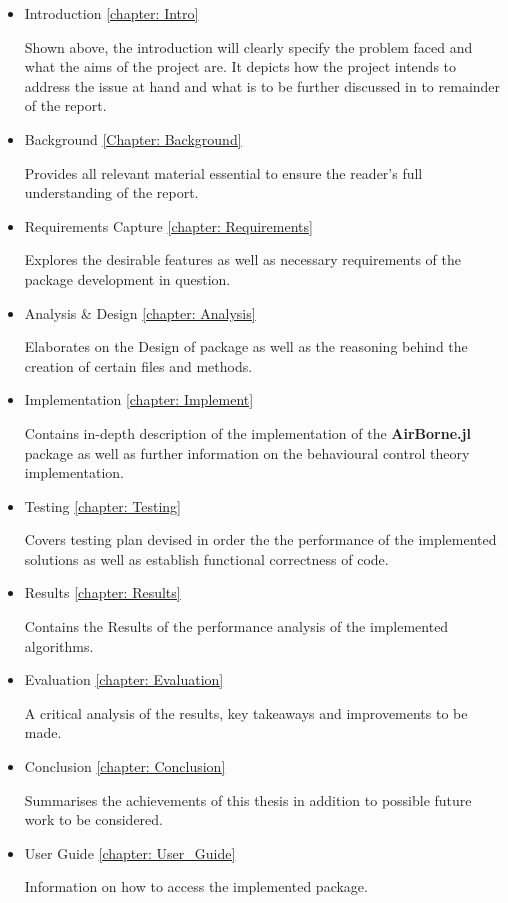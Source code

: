 \begin{itemize}
     \item Introduction \ref{chapter: Intro}
     
     Shown above, the introduction will clearly specify the problem faced and what the aims of the project are. It depicts how the project intends to address the issue at hand and what is to be further discussed in to remainder of the report.
     
     \item Background \ref{Chapter: Background}
     
     Provides all relevant material essential to ensure the reader's full understanding of the report.
     
     \item Requirements Capture \ref{chapter: Requirements} 
     
     Explores the desirable features as well as necessary requirements of the package development in question.
     
     \item Analysis \& Design \ref{chapter: Analysis} 
     
     Elaborates on the Design of package as well as the reasoning behind the creation of certain files and methods.
     
     \item Implementation \ref{chapter: Implement} 
     
     Contains in-depth description of the implementation of the \textbf{AirBorne.jl} package as well as further information on the behavioural control theory implementation. 
     
     \item Testing \ref{chapter: Testing} 
     
     Covers testing plan devised in order the the performance of the implemented solutions as well as establish functional correctness of code.
     
     \item Results \ref{chapter: Results} 
     
     Contains the Results of the performance analysis of the implemented algorithms.
     
     \item Evaluation \ref{chapter: Evaluation} 
     
     A critical analysis of the results, key takeaways and improvements to be made.
     
     \item Conclusion \ref{chapter: Conclusion} 
     
     Summarises the achievements of this thesis in addition to possible future work to be considered.
     
     \item User Guide \ref{chapter: User_Guide}
     
     Information on how to access the implemented package.
     
 \end{itemize}